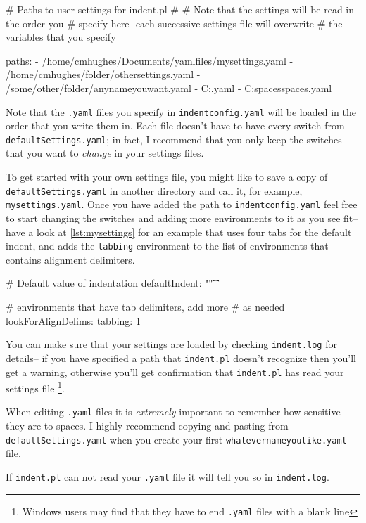 \begin{yaml}[caption={\lstinline!indentconfig.yaml!},label={lst:indentconfig}]
# Paths to user settings for indent.pl
#
# Note that the settings will be read in the order you 
# specify here- each successive settings file will overwrite
# the variables that you specify

paths:
- /home/cmhughes/Documents/yamlfiles/mysettings.yaml
- /home/cmhughes/folder/othersettings.yaml
- /some/other/folder/anynameyouwant.yaml
- C:\Users\chughes\Documents\mysettings.yaml
- C:\Users\chughes\Desktop\test spaces\more spaces.yaml
\end{yaml}
 	 	 	 	 	
Note that the \lstinline!.yaml! files you specify in \lstinline!indentconfig.yaml!
will be loaded in the order that you write them in. Each file doesn't have 
to have every switch from \lstinline!defaultSettings.yaml!; in fact, I recommend 
that you only keep the switches that you want to \emph{change} in your 
settings files.
 	 	 	 	 	
To get started with your own settings file, you might like to save a copy of 
\lstinline!defaultSettings.yaml! in another directory and call it, for 
example, \lstinline!mysettings.yaml!. Once you have added the path to \lstinline!indentconfig.yaml!
feel free to start changing the switches and adding more environments to it 
as you see fit-- have a look at \cref{lst:mysettings} for an example 
that uses four tabs for the default indent, and adds the \lstinline!tabbing!
environment to the list of environments that contains alignment delimiters.
 	 	 	 	 	
\begin{yaml}[caption={\lstinline!mysettings.yaml! (example)},label={lst:mysettings}]
# Default value of indentation
defaultIndent: "\t\t\t\t"

# environments that have tab delimiters, add more 
# as needed
lookForAlignDelims:
   tabbing: 1
\end{yaml}
 	 	 	 	 	
You can make sure that your settings are loaded by checking \lstinline!indent.log!
for details-- if you have specified a path that \lstinline!indent.pl! doesn't 
recognize then you'll get a warning, otherwise you'll get confirmation that 
\lstinline!indent.pl! has read your settings file \footnote{Windows users 
	may find that they have to end \lstinline!.yaml! files with a blank line}.
 	 	 	 	 	
\begin{warning}
	When editing \lstinline!.yaml! files it is \emph{extremely} important 
	to remember how sensitive they are to spaces. I highly recommend copying 
	and pasting from \lstinline!defaultSettings.yaml! when you create your
	first \lstinline!whatevernameyoulike.yaml! file.
						
	If \lstinline!indent.pl! can not read your \lstinline!.yaml! file it 
	will tell you so in \lstinline!indent.log!.
\end{warning}
 	 	 	 	 	
